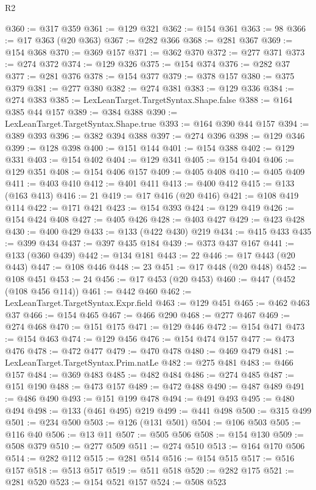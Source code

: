 \begin{lexlean}{R2}
\begin{coremodule}
@360 := @317 @359
@361 := @129 @321
@362 := @154 @361
@363 := 98
@366 := @17 @363 (@20 @363)
@367 := @282 @366
@368 := @281 @367
@369 := @154 @368
@370 := @369 @157
@371 := @362 @370
@372 := @277 @371
@373 := @274 @372
@374 := @129 @326
@375 := @154 @374
@376 := @282 @37
@377 := @281 @376
@378 := @154 @377
@379 := @378 @157
@380 := @375 @379
@381 := @277 @380
@382 := @274 @381
@383 := @129 @336
@384 := @274 @383
@385 := LexLeanTarget.TargetSyntax.Shape.false
@388 := @164 @385 @44 @157
@389 := @384 @388
@390 := LexLeanTarget.TargetSyntax.Shape.true
@393 := @164 @390 @44 @157
@394 := @389 @393
@396 := @382 @394 @388
@397 := @274 @396
@398 := @129 @346
@399 := @128 @398
@400 := @151 @144
@401 := @154 @388
@402 := @129 @331
@403 := @154 @402
@404 := @129 @341
@405 := @154 @404
@406 := @129 @351
@408 := @154 @406 @157
@409 := @405 @408
@410 := @405 @409
@411 := @403 @410
@412 := @401 @411
@413 := @400 @412
@415 := @133 (@163 @413)
@416 := 21
@419 := @17 @416 (@20 @416)
@421 := @108 @419 @114
@422 := @171 @421
@423 := @154 @393
@424 := @129 @419
@426 := @154 @424 @408
@427 := @405 @426
@428 := @403 @427
@429 := @423 @428
@430 := @400 @429
@433 := @133 (@422 @430) @219
@434 := @415 @433
@435 := @399 @434
@437 := @397 @435 @184
@439 := @373 @437 @167
@441 := @133 (@360 @439)
@442 := @134 @181
@443 := 22
@446 := @17 @443 (@20 @443)
@447 := @108 @446
@448 := 23
@451 := @17 @448 (@20 @448)
@452 := @108 @451
@453 := 24
@456 := @17 @453 (@20 @453)
@460 := @447 (@452 (@108 @456 @114))
@461 := @442 @460
@462 := LexLeanTarget.TargetSyntax.Expr.field
@463 := @129 @451
@465 := @462 @463 @37
@466 := @154 @465
@467 := @466 @290
@468 := @277 @467
@469 := @274 @468
@470 := @151 @175
@471 := @129 @446
@472 := @154 @471
@473 := @154 @463
@474 := @129 @456
@476 := @154 @474 @157
@477 := @473 @476
@478 := @472 @477
@479 := @470 @478
@480 := @469 @479
@481 := LexLeanTarget.TargetSyntax.Prim.natLe
@482 := @275 @481
@483 := @466 @157
@484 := @369 @483
@485 := @482 @484
@486 := @274 @485
@487 := @151 @190
@488 := @473 @157
@489 := @472 @488
@490 := @487 @489
@491 := @486 @490
@493 := @151 @199 @478
@494 := @491 @493
@495 := @480 @494
@498 := @133 (@461 @495) @219
@499 := @441 @498
@500 := @315 @499
@501 := @234 @500
@503 := @126 (@131 @501)
@504 := @106 @503
@505 := @116 @40
@506 := @13 @11
@507 := @505 @506
@508 := @154 @130
@509 := @508 @379
@510 := @277 @509
@511 := @274 @510
@513 := @164 @170 @506
@514 := @282 @112
@515 := @281 @514
@516 := @154 @515
@517 := @516 @157
@518 := @513 @517
@519 := @511 @518
@520 := @282 @175
@521 := @281 @520
@523 := @154 @521 @157
@524 := @508 @523

\end{coremodule}
\end{lexlean}
